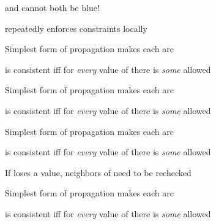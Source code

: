 \documentclass{article}
\begin{document}
\begin{huge}
\maxfigwidth
{}

 and  cannot both be blue!

 repeatedly enforces constraints locally


Simplest form of propagation makes each arc 

 is consistent iff\al
  for \emph{every} value  of  there is \emph{some} allowed 

\vspace*{0.1in}

\maxfigwidth
{}


Simplest form of propagation makes each arc 

 is consistent iff\al
  for \emph{every} value  of  there is \emph{some} allowed 

\vspace*{0.1in}

\maxfigwidth
{}


Simplest form of propagation makes each arc 

 is consistent iff\al
  for \emph{every} value  of  there is \emph{some} allowed 

\vspace*{0.1in}

\maxfigwidth
{}

If  loses a value, neighbors of  need to be rechecked


Simplest form of propagation makes each arc 

 is consistent iff\al
  for \emph{every} value  of  there is \emph{some} allowed 


\end{huge}
\end{document}

